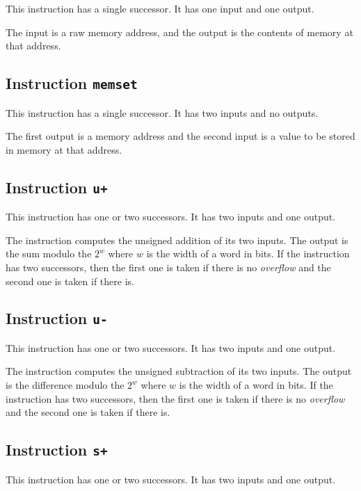 This instruction has a single successor.  It has one input and one
output.  

The input is a raw memory address, and the output is the contents of
memory at that address. 

\subsection{Instruction \texttt{memset}}
\label{mir-instruction-memset}

This instruction has a single successor.  It has two inputs and no
outputs. 

The first output is a memory address and the second input is a value
to be stored in memory at that address. 

\subsection{Instruction \texttt{u+}}
\label{mir-instruction-u+}

This instruction has one or two successors.  It has two inputs and one
output.

The instruction computes the unsigned addition of its two inputs.  The
output is the sum modulo the $2^w$ where $w$ is the width of a word in
bits.  If the instruction has two successors, then the first one is
taken if there is no \emph{overflow} and the second one is taken if
there is.  

\subsection{Instruction \texttt{u-}}
\label{mir-instruction-u-}

This instruction has one or two successors.  It has two inputs and one
output.

The instruction computes the unsigned subtraction of its two inputs.
The output is the difference modulo the $2^w$ where $w$ is the width
of a word in bits.  If the instruction has two successors, then the
first one is taken if there is no \emph{overflow} and the second one
is taken if there is.

\subsection{Instruction \texttt{s+}}
\label{mir-instruction-s+}

This instruction has one or two successors.  It has two inputs and one
output.

